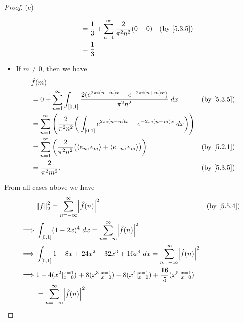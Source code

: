 \begin{proof}{(c)}
\begin{itemize}
\begin{align*}
                       & = \dfrac{1}{3} + \sum_{n = 1}^\infty \dfrac{2}{\pi^2 n^2} (0 + 0)                                                                       &  & \by{5.3.5}                  \\
                       & = \dfrac{1}{3}.
          \end{align*}
    \item If \(m \neq 0\), then we have
          \begin{align*}
             & \hat{f}(m)                                                                                                                                             \\
             & = 0 + \sum_{n = 1}^\infty \int_{[0, 1]} \dfrac{2 (e^{2 \pi i (n - m) x} + e^{- 2 \pi i (n + m) x})}{\pi^2 n^2} \; dx                   &  & \by{5.3.5} \\
             & = \sum_{n = 1}^\infty \Bigg(\dfrac{2}{\pi^2 n^2} \bigg(\int_{[0, 1]} e^{2 \pi i (n - m) x} + e^{- 2 \pi i (n + m) x} \; dx\bigg)\Bigg)                 \\
             & = \sum_{n = 1}^\infty \bigg(\dfrac{2}{\pi^2 n^2} \big(\inner*{e_n, e_m} + \inner*{e_{-n}, e_m}\big)\bigg)                              &  & \by{5.2.1} \\
             & = \dfrac{2}{\pi^2 m^2}.                                                                                                                &  & \by{5.3.5}
          \end{align*}
  \end{itemize}
  From all cases above we have
  \begin{align*}
             & \norm*{f}_2^2 = \sum_{n = -\infty}^\infty \abs{\hat{f}(n)}^2                                                                         &  & \by{5.5.4}                    \\
    \implies & \int_{[0, 1]} (1 - 2x)^4 \; dx = \sum_{n = -\infty}^\infty \abs{\hat{f}(n)}^2                                                                                           \\
    \implies & \int_{[0, 1]} 1 - 8x + 24x^2 - 32x^3 + 16x^4 \; dx = \sum_{n = -\infty}^\infty \abs{\hat{f}(n)}^2                                                                       \\
    \implies & 1 - 4 (x^2|_{x = 0}^{x = 1}) + 8 (x^3|_{x = 0}^{x = 1}) - 8(x^4|_{x = 0}^{x = 1}) + \dfrac{16}{5}(x^5|_{x = 0}^{x = 1})                                                 \\
             & = \sum_{n = -\infty}^\infty \abs{\hat{f}(n)}^2                                                                                                                          \\

\end{align*}
\end{proof}
